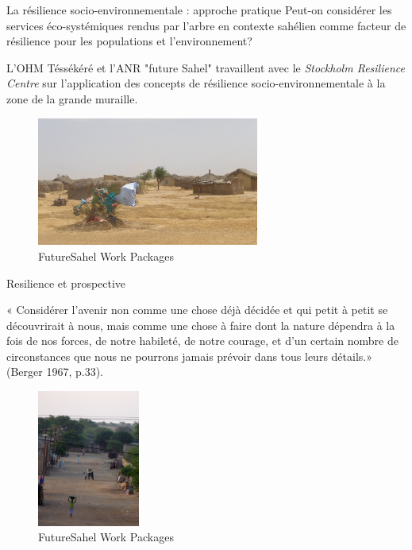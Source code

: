 \documentclass[newPxFont]{beamer}
\begin{document}
\begin{frame}[c]{La résilience socio-environnementale : approche pratique}
\vspace{-1cm}
Peut-on considérer les services éco-systémiques rendus par l'arbre en contexte sahélien comme
facteur de résilience pour les populations et l'environnement?

L'OHM Téssékéré et l'ANR "future Sahel" travaillent avec le \textit{Stockholm Resilience Centre} sur l'application des concepts de résilience socio-environnementale à la zone de la grande muraille.

\begin{figure}
	\centering
	\includegraphics[width = 0.65\textwidth]{img/PA310152.JPG}
	\caption{FutureSahel Work Packages}
\end{figure}
\end{frame}


\begin{frame}[c]{Resilience et prospective}
\vspace{-1cm}

« Considérer l’avenir non comme une chose déjà décidée et qui petit à petit se
découvrirait à nous, mais comme une chose à faire dont la nature dépendra
à la fois de nos forces, de notre habileté, de notre courage, et d’un certain
nombre de circonstances que nous ne pourrons jamais prévoir dans tous leurs
détails.» (Berger 1967, p.33).

\begin{figure}
	\centering
	\includegraphics[width = 0.3\textwidth]{img/RossBethio_3424.JPG}
	\caption{FutureSahel Work Packages}
\end{figure}
\end{frame}
\end{document}
